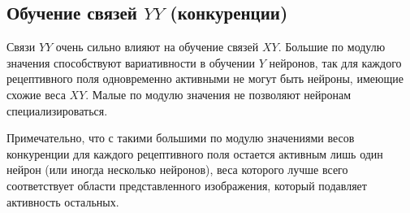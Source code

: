 \documentclass[a4paper]{article}
\begin{document}
\subsection{Обучение связей $YY$ (конкуренции)}
Связи $YY$ очень сильно влияют на обучение связей $XY$. Большие по модулю значения способствуют вариативности в обучении $Y$ нейронов, так для каждого рецептивного поля одновременно активными не могут быть нейроны, имеющие схожие веса $XY$. Малые по модулю значения не позволяют нейронам специализироваться. 

Примечательно, что с такими большими по модулю значениями весов конкуренции для каждого рецептивного поля остается активным лишь один нейрон (или иногда несколько нейронов), веса которого лучше всего соответствует области представленного изображения, который подавляет активность остальных.
\end{document}
